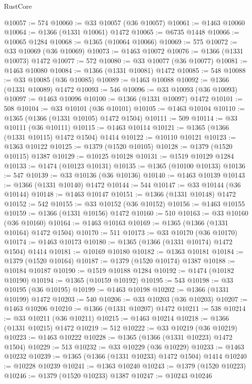 \begin{lexlean}{RustCore}
\begin{coremodule}
@10057 := 574
@10060 := @33 @10057 (@36 @10057)
@10061 := @1463 @10060
@10064 := @1366 (@1331 @10061) @1472
@10065 := @6735 @1448
@10066 := @10065 @1284
@10068 := @1365 (@10064 @10066)
@10069 := 575
@10072 := @33 @10069 (@36 @10069)
@10073 := @1463 @10072
@10076 := @1366 (@1331 @10073) @1472
@10077 := 572
@10080 := @33 @10077 (@36 @10077)
@10081 := @1463 @10080
@10084 := @1366 (@1331 @10081) @1472
@10085 := 548
@10088 := @33 @10085 (@36 @10085)
@10089 := @1463 @10088
@10092 := @1366 (@1331 @10089) @1472
@10093 := 546
@10096 := @33 @10093 (@36 @10093)
@10097 := @1463 @10096
@10100 := @1366 (@1331 @10097) @1472
@10101 := 508
@10104 := @33 @10101 (@36 @10101)
@10105 := @1463 @10104
@10110 := @1365 (@1366 (@1331 @10105) @1472 @1504)
@10111 := 509
@10114 := @33 @10111 (@36 @10111)
@10115 := @1463 @10114
@10121 := @1365 (@1366 (@1331 @10115) @1472 @1504) @1414
@10122 := @10110 @10121
@10123 := @1363 @10122
@10125 := @1379 (@1520 @10105)
@10128 := @1379 (@1520 @10115) @1387
@10129 := @10125 @10128
@10131 := @1519 @10129 @1284
@10133 := @1474 (@10123 @10131)
@10135 := @1365 (@10100 @10133)
@10136 := 547
@10139 := @33 @10136 (@36 @10136)
@10140 := @1463 @10139
@10143 := @1366 (@1331 @10140) @1472
@10144 := 544
@10147 := @33 @10144 (@36 @10144)
@10148 := @1463 @10147
@10151 := @1366 (@1331 @10148) @1472
@10152 := 542
@10155 := @33 @10152 (@36 @10152)
@10156 := @1463 @10155
@10159 := @1366 (@1331 @10156) @1472
@10160 := 510
@10163 := @33 @10160 (@36 @10160)
@10164 := @1463 @10163
@10169 := @1365 (@1366 (@1331 @10164) @1472 @1504)
@10170 := 511
@10173 := @33 @10170 (@36 @10170)
@10174 := @1463 @10173
@10180 := @1365 (@1366 (@1331 @10174) @1472 @1504) @1414
@10181 := @10169 @10180
@10182 := @1363 @10181
@10184 := @1379 (@1520 @10164)
@10187 := @1379 (@1520 @10174) @1387
@10188 := @10184 @10187
@10190 := @1519 @10188 @1284
@10192 := @1474 (@10182 @10190)
@10194 := @1365 (@10159 @10192)
@10195 := 543
@10198 := @33 @10195 (@36 @10195)
@10199 := @1463 @10198
@10202 := @1366 (@1331 @10199) @1472
@10203 := 540
@10206 := @33 @10203 (@36 @10203)
@10207 := @1463 @10206
@10210 := @1366 (@1331 @10207) @1472
@10211 := 538
@10214 := @33 @10211 (@36 @10211)
@10215 := @1463 @10214
@10218 := @1366 (@1331 @10215) @1472
@10219 := 512
@10222 := @33 @10219 (@36 @10219)
@10223 := @1463 @10222
@10228 := @1365 (@1366 (@1331 @10223) @1472 @1504)
@10229 := 513
@10232 := @33 @10229 (@36 @10229)
@10233 := @1463 @10232
@10239 := @1365 (@1366 (@1331 @10233) @1472 @1504) @1414
@10240 := @10228 @10239
@10241 := @1363 @10240
@10243 := @1379 (@1520 @10223)
@10246 := @1379 (@1520 @10233) @1387
@10247 := @10243 @10246

\end{coremodule}
\end{lexlean}
